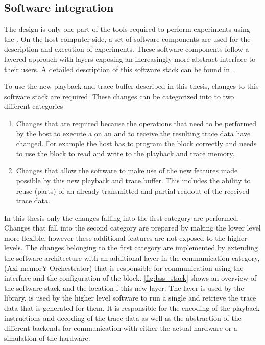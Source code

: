 \subsection{Software integration}\label{sec:ayo}
The \FPGA{} design is only one part of the tools required to perform experiments using the \HICANNX{}. On the host computer side, a set of software components are used for the description and execution of experiments. These software components follow a layered approach with layers exposing an increasingly more abstract interface to their users. A detailed description of this software stack can be found in \autocite{mueller2022scalable}.

To use the new playback and trace buffer described in this thesis, changes to this software stack are required. These changes can be categorized into to two different categories
\begin{enumerate}
\item Changes that are required because the operations that need to be performed by the host to execute a \PlaybackProgram{} on  an \FPGA{} and to receive the resulting trace data have changed. For example the host has to program the \AXIDMA{} block correctly and needs to use the \FAXI{} block to read and write to the playback and trace memory.
\item Changes that allow the software to make use of the new features made possible by this new playback and trace buffer. This includes the ability to reuse (parts) of an already transmitted \PlaybackProgram{} and partial readout of the received trace data.
\end{enumerate}

In this thesis only the changes falling into the first category are performed. Changes that fall into the second category are prepared by making the lower level \API{} more flexible, however these additional features are not exposed to the higher levels. The changes belonging to the first category are implemented by extending the \BSSTwo{} software architecture with an additional layer in the communication category, \ayo{} (Axi memorY Orchestrator) that is responsible for communication using the \FAXI{} interface and the configuration of the \AXIDMA{} block. \autoref{fig:bss_stack} shows an overview of the software stack and the location f this new \ayo{} layer. The \ayo{} layer is used by the \hxcomm{} library. \hxcomm{} is used by the higher level software to run a single \PlaybackProgram{} and retrieve the trace data that is generated for them. It is responsible for the \UT{} encoding of the playback instructions and \UT{} decoding of the trace data as well as the abstraction of the different backends for communication with either the actual hardware or a simulation of the hardware.

